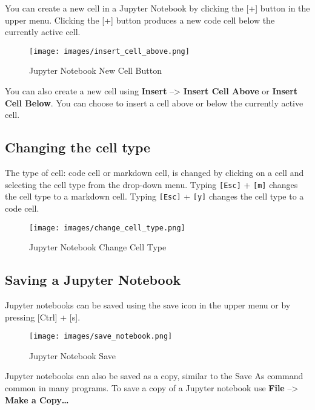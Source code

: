 \documentclass{book}
\makeatletter
\def\maxwidth{\ifdim\Gin@nat@width>\linewidth\linewidth
\else\Gin@nat@width\fi}
\let\Oldincludegraphics\includegraphics
\renewcommand{\includegraphics}[1]{\Oldincludegraphics[width=.8\maxwidth]{#1}}
\newcommand{\passthrough}[1]{#1}
\makeatother
\begin{document}
You can create a new cell in a Jupyter Notebook by clicking the {[}+{]}
button in the upper menu. Clicking the {[}+{]} button produces a new
code cell below the currently active cell.

\begin{figure}
\centering
\texttt{[image: images/insert\_cell\_above.png]}
\caption{Jupyter Notebook New Cell Button}
\end{figure}

You can also create a new cell using \textbf{Insert} --\textgreater{}
\textbf{Insert Cell Above} or \textbf{Insert Cell Below}. You can choose
to insert a cell above or below the currently active cell.
    




    
        \hypertarget{changing-the-cell-type}{%
\subsection{Changing the cell type}\label{changing-the-cell-type}}

The type of cell: code cell or markdown cell, is changed by clicking on
a cell and selecting the cell type from the drop-down menu. Typing
\passthrough{\lstinline![Esc]!} + \passthrough{\lstinline![m]!} changes
the cell type to a markdown cell. Typing \passthrough{\lstinline![Esc]!}
+ \passthrough{\lstinline![y]!} changes the cell type to a code cell.

\begin{figure}
\centering
\texttt{[image: images/change\_cell\_type.png]}
\caption{Jupyter Notebook Change Cell Type}
\end{figure}
    




    
        \hypertarget{saving-a-jupyter-notebook}{%
\subsection{Saving a Jupyter Notebook}\label{saving-a-jupyter-notebook}}

Jupyter notebooks can be saved using the save icon in the upper menu or
by pressing {[}Ctrl{]} + {[}s{]}.

\begin{figure}
\centering
\texttt{[image: images/save\_notebook.png]}
\caption{Jupyter Notebook Save}
\end{figure}

Jupyter notebooks can also be saved as a copy, similar to the Save As
command common in many programs. To save a copy of a Jupyter notebook
use \textbf{File} --\textgreater{} \textbf{Make a Copy\ldots{}}
\end{document}
